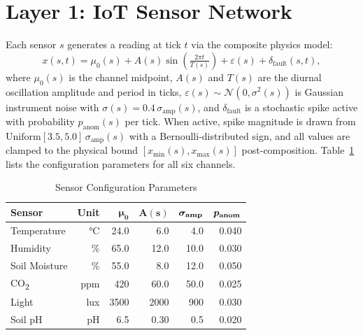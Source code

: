 \documentclass[journal,10pt,twocolumn]{IEEEtran}
\begin{document}
\section{Layer 1: IoT Sensor Network}
\label{sec:iot}

Each sensor $s$ generates a reading at tick $t$ via the composite
physics model:
\begin{equation}
  x(s,t) = \mu_0(s)
    + A(s)\sin\!\left(\tfrac{2\pi t}{T(s)}\right)
    + \varepsilon(s)
    + \delta_{\mathrm{fault}}(s,t),
  \label{eq:sensor}
\end{equation}
where $\mu_0(s)$ is the channel midpoint, $A(s)$ and $T(s)$ are
the diurnal oscillation amplitude and period in ticks,
$\varepsilon(s)\!\sim\!\mathcal{N}(0,\sigma^2(s))$ is Gaussian
instrument noise with $\sigma(s){=}0.4\,\sigma_{\mathrm{amp}}(s)$,
and $\delta_{\mathrm{fault}}$ is a stochastic spike active with
probability $p_{\mathrm{anom}}(s)$ per tick.
When active, spike magnitude is drawn from
$\mathrm{Uniform}[3.5,5.0]\,\sigma_{\mathrm{amp}}(s)$ with a
Bernoulli-distributed sign, and all values are clamped to the
physical bound $[x_{\min}(s),x_{\max}(s)]$ post-composition.
Table~\ref{tab:sensors} lists the configuration parameters for all
six channels.

\begin{table}[t]
\caption{Sensor Configuration Parameters}
\label{tab:sensors}
\centering
\footnotesize
\setlength\tabcolsep{3pt}
\begin{tabular}{lrrrrr}
\toprule
\textbf{Sensor} & \textbf{Unit}
  & $\boldsymbol{\mu_0}$ & $\boldsymbol{A(s)}$
  & $\boldsymbol{\sigma_{\rm amp}}$ & $\boldsymbol{p_{\rm anom}}$\\
\midrule
Temperature         & °C   & 24.0 & 6.0  & 4.0  & 0.040 \\
Humidity            & \%   & 65.0 & 12.0 & 10.0 & 0.030 \\
Soil Moisture       & \%   & 55.0 & 8.0  & 12.0 & 0.050 \\
CO\textsubscript{2} & ppm  & 420  & 60.0 & 50.0 & 0.025 \\
Light               & lux  & 3500 & 2000 & 900  & 0.030 \\
Soil pH             & pH   & 6.5  & 0.30 & 0.5  & 0.020 \\
\bottomrule
\end{tabular}
\end{table}
\end{document}
